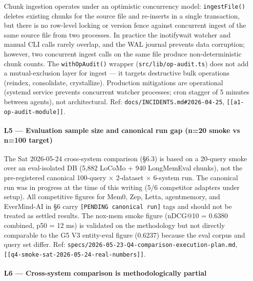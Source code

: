\documentclass[
]{article}
\begin{document}
Chunk ingestion operates under an optimistic concurrency model:
\texttt{ingestFile()} deletes existing chunks for the source file and
re-inserts in a single transaction, but there is no row-level locking or
version fence against concurrent ingest of the same source file from two
processes. In practice the inotifywait watcher and manual CLI calls
rarely overlap, and the WAL journal prevents data corruption; however,
two concurrent ingest calls on the same file produce non-deterministic
chunk counts. The \texttt{withOpAudit()} wrapper
(\texttt{src/lib/op-audit.ts}) does not add a mutual-exclusion layer for
ingest --- it targets destructive bulk operations (reindex, consolidate,
crystallize). Production mitigations are operational (systemd service
prevents concurrent watcher processes; cron stagger of 5 minutes between
agents), not architectural. Ref: \texttt{docs/INCIDENTS.md\#2026-04-25},
\texttt{{[}{[}a1-op-audit-module{]}{]}}.

\paragraph{L5 --- Evaluation sample size and canonical run gap (n=20
smoke vs n=100
target)}\label{l5-evaluation-sample-size-and-canonical-run-gap-n20-smoke-vs-n100-target}

The Sat 2026-05-24 cross-system comparison (§6.3) is based on a 20-query
smoke over an eval-isolated DB (5,882 LoCoMo + 940 LongMemEval chunks),
not the pre-registered canonical 100-query × 2-dataset × 6-system run.
The canonical run was in progress at the time of this writing (5/6
competitor adapters under setup). All competitive figures for Mem0, Zep,
Letta, agentmemory, and EverMind-AI in §6 carry
\texttt{{[}PENDING\ canonical\ run{]}} tags and should not be treated as
settled results. The nox-mem smoke figure (nDCG@10 = 0.6380 combined,
p50 = 12 ms) is validated on the methodology but not directly comparable
to the G5 V3 entity-eval figure (0.6237) because the eval corpus and
query set differ. Ref:
\texttt{specs/2026-05-23-Q4-comparison-execution-plan.md},
\texttt{{[}{[}q4-smoke-sat-2026-05-24-real-numbers{]}{]}}.

\paragraph{L6 --- Cross-system comparison is methodologically
partial}\label{l6-cross-system-comparison-is-methodologically-partial}
\end{document}
